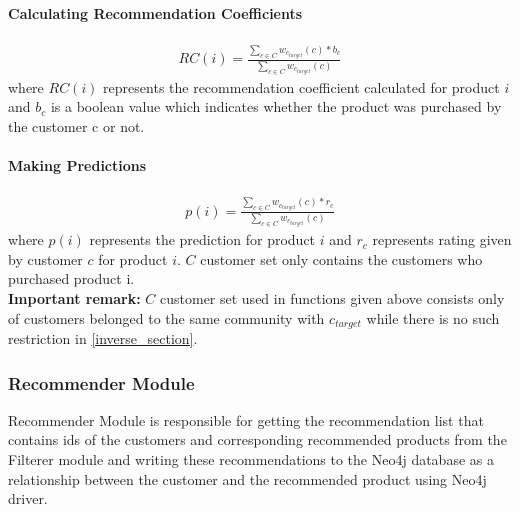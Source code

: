 	\paragraph{Calculating Recommendation Coefficients}	
	\begin{equation*} 
	\begin{split}
	RC(i) = \frac{\sum_{c \in C}^{} w_{c_{target}}(c)*b_{c}}{\sum_{c \in C}^{} w_{c_{target}}(c)}
	\end{split}
	\end{equation*}
	where $RC(i)$ represents the recommendation coefficient calculated for product $i$ and $b_{c}$ is a boolean value which indicates whether the product was purchased by the customer c or not.


	\paragraph{Making Predictions}
	\begin{equation*} 
	\begin{split}
	p(i) = \frac{\sum_{c \in C}^{} w_{c_{target}}(c)*r_{c}}{\sum_{c \in C}^{} w_{c_{target}}(c)}
	\end{split}
	\end{equation*}
	where $p(i)$ represents the prediction for product $i$ and $r_{c}$ represents rating given by customer $c$ for product $i$. $C$ customer set only contains the customers who purchased product i. \\
	
	\textbf{Important remark:} $C$ customer set used in functions given above consists only of customers belonged to the same community with $c_{target}$ while there is no such restriction in \ref{inverse_section}.

	\subsubsection{Recommender Module} Recommender Module is responsible for getting the recommendation list that contains ids of the customers and corresponding recommended products from the Filterer module and writing these recommendations to the Neo4j database as a relationship between the customer and the recommended product using Neo4j driver.